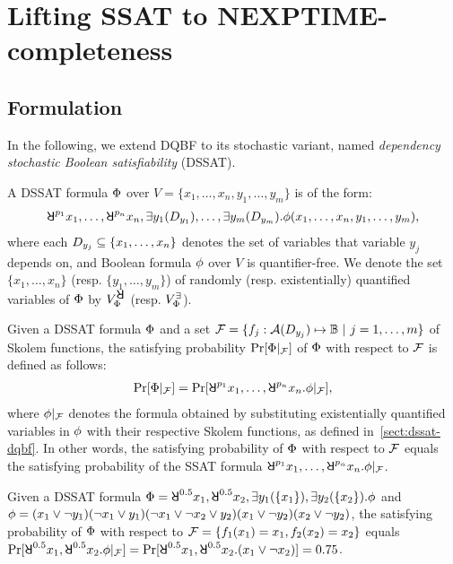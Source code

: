 \section{Lifting SSAT to NEXPTIME-completeness}
\label{sect:dssat-technique}

\subsection{Formulation}
In the following, we extend DQBF to its stochastic variant,
named \textit{dependency stochastic Boolean satisfiability} (DSSAT).

A DSSAT formula $\Phi$ over $V=\{x_1,\ldots,x_n,y_1,\ldots,y_m\}$ is of the form:
\begin{align}
    \label{eq:dssat}
    \random{p_1}x_1,\ldots,\random{p_n}x_n,\exists y_1(\dep{y_1}),\ldots,\exists y_m(\dep{y_m}).\pf(x_1,\ldots,x_n,y_1,\ldots,y_m),
\end{align}
where each $D_{y_j}\subseteq\{x_1,\ldots,x_n\}$ denotes the set of variables that variable $y_j$ depends on,
and Boolean formula $\phi$ over $V$ is quantifier-free.
We denote the set $\{x_1,\ldots,x_n\}$ (resp. $\{y_1,\ldots,y_m\}$) of randomly (resp. existentially) quantified variables of $\Phi$ by $\rvs$ (resp. $V_{\Phi}^{\exists}$).

Given a DSSAT formula $\Phi$ and a set $\skf=\{f_j:\av{\dep{y_j}}\mapsto\booldom\ |\ j=1,\ldots,m\}$ of Skolem functions,
the satisfying probability $\Pr[\Phi|_{\mathcal{F}}]$ of $\Phi$ with respect to $\mathcal{F}$ is defined as follows:
\begin{align}\label{eq:dssat-probability}
    \spb{\pcf{\Qf}{\skf}}=\spb{\random{p_1}x_1,\ldots,\random{p_n}x_n.\pcf{\pf}{\skf}},
\end{align}
where $\phi|_{\mathcal{F}}$ denotes the formula obtained by substituting existentially quantified variables in $\phi$ with their respective Skolem functions, as defined in~\cref{sect:dssat-dqbf}.
In other words, the satisfying probability of $\Phi$ with respect to $\mathcal{F}$ equals
the satisfying probability of the SSAT formula $\random{p_1}x_1,\ldots,\random{p_n}x_n.\pcf{\pf}{\skf}$.

\begin{example}
    Given a DSSAT formula $\Qf=\random{0.5}x_1,\random{0.5}x_2,\exists y_1(\{x_1\}),\exists y_2(\{x_2\}).\pf$
    and $\phi=(x_1\lor\lnot y_1)(\lnot x_1\lor y_1)(\lnot x_1\lor\lnot x_2\lor y_2)(x_1\lor\lnot y_2)(x_2\lor\lnot y_2)$,
    the satisfying probability of $\Phi$ with respect to $\mathcal{F}=\{f_1(x_1)=x_1,f_2(x_2)=x_2\}$
    equals $\spb{\random{0.5} x_1,\random{0.5} x_2.\pcf{\pf}{\skf}}=\spb{\random{0.5} x_1,\random{0.5} x_2.(x_1\lor\lnot x_2)}=0.75$.
\end{example}

